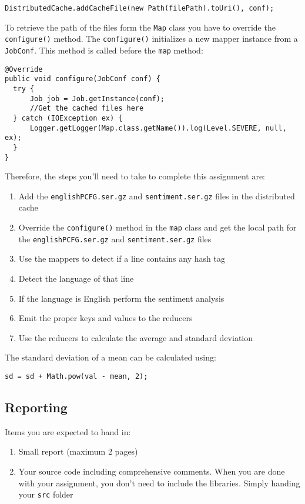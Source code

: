 \documentclass[a4paper,10pt]{article}
\begin{document}
\begin{lstlisting}
DistributedCache.addCacheFile(new Path(filePath).toUri(), conf);
\end{lstlisting}

To retrieve the path of the files form the \texttt{Map} class you have to override the \texttt{configure()} method. The \texttt{configure()} initializes a new mapper instance from a \texttt{JobConf}. This method is called before the \texttt{map} method:
\begin{lstlisting}
@Override
public void configure(JobConf conf) {
  try {
      Job job = Job.getInstance(conf);
      //Get the cached files here
  } catch (IOException ex) {
      Logger.getLogger(Map.class.getName()).log(Level.SEVERE, null, ex);
  }
}
\end{lstlisting}

Therefore, the steps you'll need to take to complete this assignment are: 

\begin{enumerate}
\item Add the \texttt{englishPCFG.ser.gz}  and \texttt{sentiment.ser.gz} files in the distributed cache
\item Override the \texttt{configure()} method in the \texttt{map} class and get the local path for the \texttt{englishPCFG.ser.gz}  and \texttt{sentiment.ser.gz} files
 \item Use the mappers to detect if a line contains any hash tag
 \item Detect the language of that line 
 \item If the language is English perform the sentiment analysis
 \item Emit the proper keys and values to the reducers 
 \item Use the reducers to calculate the average and standard deviation 
\end{enumerate}

The standard deviation of a mean can be calculated using: 
\begin{lstlisting}
sd = sd + Math.pow(val - mean, 2);
\end{lstlisting}


\subsection{Reporting} \label{sec:report}
Items you are expected to hand in:

\begin{enumerate}
 \item Small report (maximum 2 pages) 
 \item Your source code including comprehensive comments. When you are done with your assignment, you don't need to include the libraries. Simply handing your \texttt{src} folder 
\end{enumerate}
\end{document}
